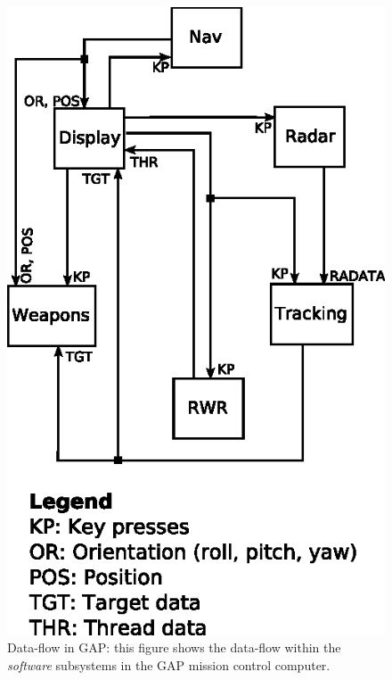 \begin{figure}
\centering
\includegraphics{figs/dataflow}
\caption[Data-flow in the Generic Avionics Platform]{Data-flow in GAP:
  {\normalsize this figure shows the data-flow within the
    \emph{software} subsystems in the GAP mission control computer}.}
\label{fig:dataflow}
\end{figure}

